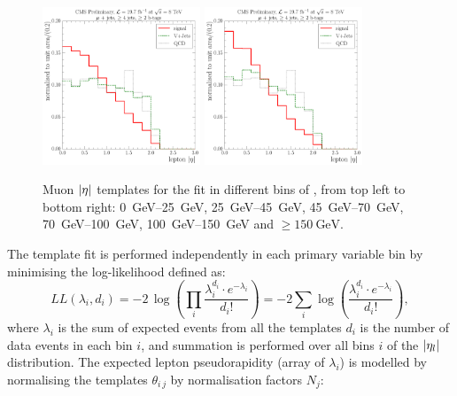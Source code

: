 \begin{figure}[!htbp]
  	\hspace*{\fill} \\
  	\hspace*{\fill}
  	{\includegraphics[width=0.42\textwidth]{measurement/MET/central/fit_templates/muon_templates_bin_100-150}}\hfill
  	{\includegraphics[width=0.42\textwidth]{measurement/MET/central/fit_templates/muon_templates_bin_150-inf}}
  	\hspace*{\fill}
    \caption{Muon $\lvert \eta \rvert$ templates for the fit in different bins of \MET, from top left to bottom right:
    \SIrange{0}{25}{\GeV}, \SIrange{25}{45}{\GeV}, \SIrange{45}{70}{\GeV}, \SIrange{70}{100}{\GeV},
    \SIrange{100}{150}{\GeV} and $\geq \SI{150}{\GeV}$.}
    \label{fig:fit_templates_MET_muon}
\end{figure}


The template fit is performed independently in each primary variable bin by minimising the log-likelihood defined as:
\begin{equation}
\label{eq:xsection_loglikelihood}
LL(\lambda_i,d_i)=-2\,\log{\left(\prod\limits_{i}\frac{\lambda_i^{d_i}\cdot
e^{-\lambda_i}}{d_i!}\right)}=-2\sum\limits_{i}\log{\left(\frac{\lambda_i^{d_i}\cdot e^{-\lambda_i}}{d_i!}\right)},
\end{equation}
where $\lambda_i$ is the sum of expected events from all the templates $d_i$ is the number of data events in each bin
$i$, and summation is performed over all bins $i$ of the $\lvert \eta_l \rvert$ distribution. The expected lepton
pseudorapidity (array of $\lambda_i$) is modelled by normalising the templates $\theta_{i\,j}$ by normalisation factors
$N_j$:

